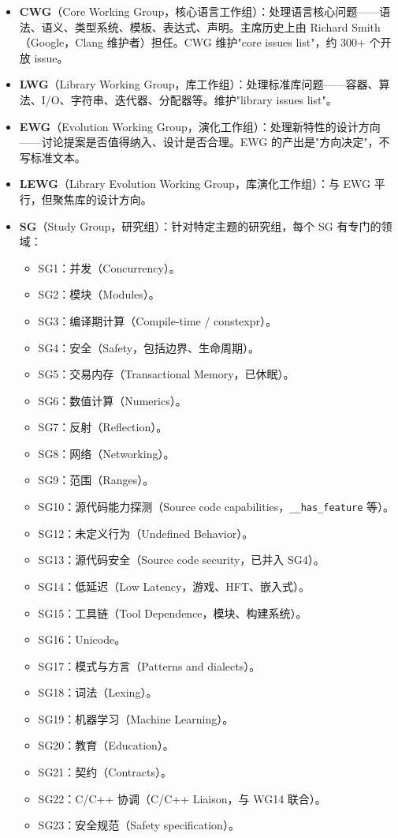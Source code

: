 \documentclass[12pt,a4paper,fontset=fandol]{ctexbook}
\newcommand{\kw}[1]{\texttt{#1}}
\begin{document}
\begin{itemize}
  \item \textbf{CWG}（Core Working Group，核心语言工作组）：处理语言核心问题——语法、语义、类型系统、模板、表达式、声明。主席历史上由 Richard Smith（Google，Clang 维护者）担任。CWG 维护"core issues list"，约 300+ 个开放 issue。
  \item \textbf{LWG}（Library Working Group，库工作组）：处理标准库问题——容器、算法、I/O、字符串、迭代器、分配器等。维护"library issues list"。
  \item \textbf{EWG}（Evolution Working Group，演化工作组）：处理新特性的设计方向——讨论提案是否值得纳入、设计是否合理。EWG 的产出是"方向决定"，不写标准文本。
  \item \textbf{LEWG}（Library Evolution Working Group，库演化工作组）：与 EWG 平行，但聚焦库的设计方向。
  \item \textbf{SG}（Study Group，研究组）：针对特定主题的研究组，每个 SG 有专门的领域：
    \begin{itemize}
      \item SG1：并发（Concurrency）。
      \item SG2：模块（Modules）。
      \item SG3：编译期计算（Compile-time / constexpr）。
      \item SG4：安全（Safety，包括边界、生命周期）。
      \item SG5：交易内存（Transactional Memory，已休眠）。
      \item SG6：数值计算（Numerics）。
      \item SG7：反射（Reflection）。
      \item SG8：网络（Networking）。
      \item SG9：范围（Ranges）。
      \item SG10：源代码能力探测（Source code capabilities，\kw{\_\_has\_feature} 等）。
      \item SG12：未定义行为（Undefined Behavior）。
      \item SG13：源代码安全（Source code security，已并入 SG4）。
      \item SG14：低延迟（Low Latency，游戏、HFT、嵌入式）。
      \item SG15：工具链（Tool Dependence，模块、构建系统）。
      \item SG16：Unicode。
      \item SG17：模式与方言（Patterns and dialects）。
      \item SG18：词法（Lexing）。
      \item SG19：机器学习（Machine Learning）。
      \item SG20：教育（Education）。
      \item SG21：契约（Contracts）。
      \item SG22：C/C++ 协调（C/C++ Liaison，与 WG14 联合）。
      \item SG23：安全规范（Safety specification）。
    \end{itemize}
\end{itemize}
\end{document}
